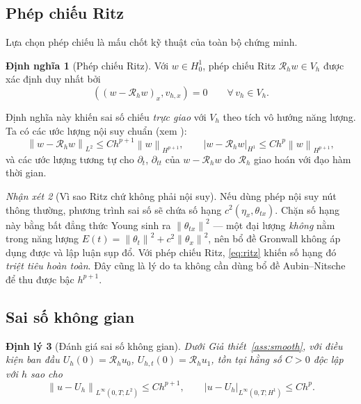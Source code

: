 \documentclass[11pt,a4paper]{article}
\theoremstyle{plain}
\newtheorem{theorem}{Định lý}[section]
\theoremstyle{definition}
\newtheorem{definition}[theorem]{Định nghĩa}
\theoremstyle{remark}
\newtheorem{remark}[theorem]{Nhận xét}
\newcommand{\Hone}{H^{1}}
\newcommand{\Hzero}{H^{1}_{0}}
\newcommand{\Ltwo}{L^{2}}
\newcommand{\Vh}{V_{h}}
\newcommand{\Rh}{\mathcal{R}_{h}}
\newcommand{\norm}[1]{\left\lVert #1 \right\rVert}
\newcommand{\seminorm}[1]{\left\lvert #1 \right\rvert}
\newcommand{\ip}[2]{\left( #1 , #2 \right)}
\begin{document}
\subsection{Phép chiếu Ritz}

Lựa chọn phép chiếu là mấu chốt kỹ thuật của toàn bộ chứng minh.

\begin{definition}[Phép chiếu Ritz]
\label{def:ritz}
Với $w \in \Hzero$, phép chiếu Ritz $\Rh w \in \Vh$ được xác định duy nhất
bởi
\begin{equation}
\label{eq:ritz}
  \ip{(w - \Rh w)_{x}}{v_{h,x}} = 0
  \qquad \forall\, v_{h} \in \Vh .
\end{equation}
\end{definition}

Định nghĩa này khiến sai số chiếu \emph{trực giao} với $\Vh$ theo tích vô
hướng năng lượng. Ta có các ước lượng nội suy chuẩn (xem
\cite{brenner2008,ciarlet2002}):
\begin{equation}
\label{eq:ritz-est}
  \norm{w - \Rh w}_{\Ltwo} \le C h^{p+1}\norm{w}_{H^{p+1}},
  \qquad
  \seminorm{w - \Rh w}_{\Hone} \le C h^{p}\norm{w}_{H^{p+1}},
\end{equation}
và các ước lượng tương tự cho $\partial_{t}$, $\partial_{tt}$ của
$w - \Rh w$ do $\Rh$ giao hoán với đạo hàm thời gian.

\begin{remark}[Vì sao Ritz chứ không phải nội suy]
\label{rem:whyritz}
Nếu dùng phép nội suy nút thông thường, phương trình sai số sẽ chứa số hạng
$c^{2}\ip{\eta_{x}}{\theta_{tx}}$. Chặn số hạng này bằng bất đẳng thức Young
sinh ra $\norm{\theta_{tx}}^{2}$ --- một đại lượng \emph{không} nằm trong
năng lượng $E(t) = \norm{\theta_{t}}^{2} + c^{2}\norm{\theta_{x}}^{2}$, nên
bổ đề Gronwall không áp dụng được và lập luận sụp đổ. Với phép chiếu Ritz,
\eqref{eq:ritz} khiến số hạng đó \emph{triệt tiêu hoàn toàn}. Đây cũng là lý
do ta không cần dùng bổ đề Aubin--Nitsche để thu được bậc $h^{p+1}$.
\end{remark}

\subsection{Sai số không gian}

\begin{theorem}[Đánh giá sai số không gian]
\label{thm:spatial}
Dưới Giả thiết~\ref{ass:smooth}, với điều kiện ban đầu
$U_{h}(0) = \Rh u_{0}$, $U_{h,t}(0) = \Rh u_{1}$, tồn tại hằng số $C > 0$
độc lập với $h$ sao cho
\begin{equation}
\label{eq:spatial}
  \norm{u - U_{h}}_{L^{\infty}(0,T;\Ltwo)} \le C h^{p+1},
  \qquad
  \seminorm{u - U_{h}}_{L^{\infty}(0,T;\Hone)} \le C h^{p} .
\end{equation}
\end{theorem}
\end{document}
